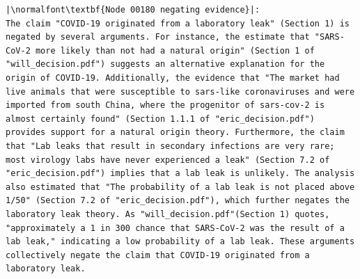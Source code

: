 \documentclass{article}
\begin{document}
\begin{lstlisting}
|\normalfont\textbf{Node 00180 negating evidence}|:
The claim "COVID-19 originated from a laboratory leak" (Section 1) is negated by several arguments. For instance, the estimate that "SARS-CoV-2 more likely than not had a natural origin" (Section 1 of "will_decision.pdf") suggests an alternative explanation for the origin of COVID-19. Additionally, the evidence that "The market had live animals that were susceptible to sars-like coronaviruses and were imported from south China, where the progenitor of sars-cov-2 is almost certainly found" (Section 1.1.1 of "eric_decision.pdf") provides support for a natural origin theory. Furthermore, the claim that "Lab leaks that result in secondary infections are very rare; most virology labs have never experienced a leak" (Section 7.2 of "eric_decision.pdf") implies that a lab leak is unlikely. The analysis also estimated that "The probability of a lab leak is not placed above 1/50" (Section 7.2 of "eric_decision.pdf"), which further negates the laboratory leak theory. As "will_decision.pdf"(Section 1) quotes, "approximately a 1 in 300 chance that SARS-CoV-2 was the result of a lab leak," indicating a low probability of a lab leak. These arguments collectively negate the claim that COVID-19 originated from a laboratory leak.
\end{lstlisting}


\printbibliography
\end{document}
